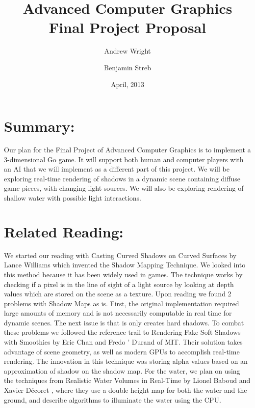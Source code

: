 \documentclass[12pt,a4paper]{report}
\begin{document}
\title{Advanced Computer Graphics Final Project Proposal}
\author{Andrew Wright \and Benjamin Streb}
\date{April, 2013}
\maketitle
\section*{Summary:}
Our plan for the Final Project of Advanced Computer Graphics is to implement a 3-dimensional Go game. It will support both human and computer players with an AI that we will implement as a different part of this project. We will be exploring real-time rendering of shadows in a dynamic scene containing diffuse game pieces, with changing light sources. We will also be exploring rendering of shallow water with possible light interactions.
\section*{Related Reading:}
We started our reading with Casting Curved Shadows on Curved Surfaces by Lance Williams \cite{williams} which invented the Shadow Mapping Technique. We looked into this method because it has been widely used in games. The technique works by checking if a pixel is in the line of sight of a light source by looking at depth values which are stored on the scene as a texture.  Upon reading we found 2 problems with Shadow Maps as is. First, the original implementation required large amounts of memory and is not necessarily computable in real time for dynamic scenes. The next issue is that is only creates hard shadows. To combat these problems we followed the reference trail to Rendering Fake Soft Shadows with Smoothies by Eric Chan \cite{smoothie} and Fredo ' Durand of MIT. Their solution takes advantage of scene geometry, as well as modern GPUs to accomplish real-time rendering. The innovation in this technique was storing alpha values based on an approximation of shadow on the shadow map. For the water, we plan on using the techniques from Realistic Water Volumes in Real-Time by Lionel Baboud and Xavier Décoret \cite{baboud}, where they use a double height map for both the water and the ground, and describe algorithms to illuminate the water using the CPU.
\end{document}
